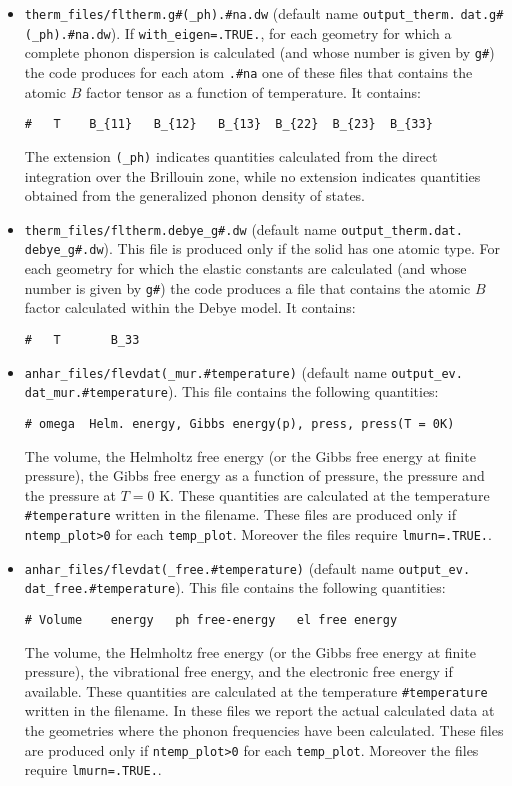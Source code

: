 \documentclass[12pt,a4paper,twoside]{report}
\begin{document}
\begin{itemize}
\item 
\texttt{therm\_files/fltherm.g\#(\_ph).\#na.dw} (default name 
\texttt{output\_therm.} \texttt{dat.g\#(\_ph).\#na.dw}). 
If \texttt{with\_eigen=.TRUE.}, for each geometry for which 
a complete phonon dispersion is calculated (and whose number is given
by \texttt{g\#}) the code produces for each atom \texttt{.\#na} one of these 
files that contains the atomic $B$ factor tensor as a function of 
temperature. It contains:
\begin{verbatim}
#   T    B_{11}   B_{12}   B_{13}  B_{22}  B_{23}  B_{33}
\end{verbatim}
The extension \texttt{(\_ph)} indicates 
quantities calculated from the direct integration over the Brillouin zone,
while no extension indicates quantities obtained from the generalized phonon 
density of states.

\item 
\texttt{therm\_files/fltherm.debye\_g\#.dw} (default name 
\texttt{output\_therm.dat.} \texttt{debye\_g\#.dw}). This file is produced
only if the solid has one atomic type. For each geometry for which 
the elastic constants are calculated (and whose number is given
by \texttt{g\#}) the code produces a file that contains 
the atomic $B$ factor calculated within the Debye model. It contains:
\begin{verbatim}
#   T       B_33 
\end{verbatim}

\item 
\texttt{anhar\_files/flevdat(\_mur.\#temperature)} (default name \texttt{output\_ev.} \texttt{dat\_mur.\#temperature}).
This file contains the following quantities:
\begin{verbatim}
# omega  Helm. energy, Gibbs energy(p), press, press(T = 0K)
\end{verbatim}
The volume, the Helmholtz free energy (or the Gibbs free
energy at finite pressure), the Gibbs free energy as a function of pressure,
the pressure and the pressure at $T = 0$ K.
These quantities are calculated at the temperature 
\texttt{\#temperature} written in the filename.
These files are produced only if \texttt{ntemp\_plot>0} for each
\texttt{temp\_plot}. Moreover the files require \texttt{lmurn=.TRUE.}.

\item
\texttt{anhar\_files/flevdat(\_free.\#temperature)} (default name \texttt{output\_ev.} \texttt{dat\_free.\#temperature}).
This file contains the following quantities:
\begin{verbatim}
# Volume    energy   ph free-energy   el free energy
\end{verbatim}
The volume, the Helmholtz free energy (or the Gibbs free
energy at finite pressure), the vibrational free energy,
and the electronic free energy if available.
These quantities are calculated at the temperature \texttt{\#temperature} 
written in the filename. In these files we report the actual calculated data
at the geometries where the phonon frequencies have been calculated.
These files are produced only if \texttt{ntemp\_plot>0} for each
\texttt{temp\_plot}. Moreover the files require \texttt{lmurn=.TRUE.}.


\end{itemize}
\end{document}
